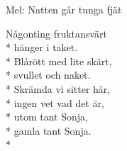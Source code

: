 \begin{SongText}
    \begin{SongInfo}
        Mel: Natten går tunga fjät
    \end{SongInfo}
    \begin{SongVerse}
        Någonting fruktansvärt\\*%
        hänger i taket.\\*%
        Blårött med lite skärt,\\*%
        svullet och naket.\\*%
        Skrämda vi sitter här,\\*%
        ingen vet vad det är,\\*%
        utom tant Sonja,\\*%
        gamla tant Sonja. \\*%
    \end{SongVerse}
\end{SongText}

